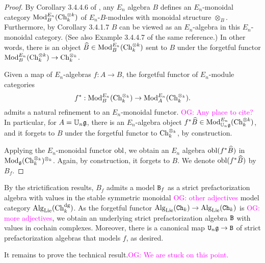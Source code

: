 \documentclass[11pt]{amsart}
\numberwithin{equation}{section}
\def\owen{\textcolor{magenta}{OG: }\textcolor{magenta}}
\begin{document}
\begin{proof}
By Corollary 3.4.4.6 of \cite{LurieHA}, any $E_n$ algebra $B$ defines an $E_n$-monoidal category ${\rm Mod}_B^{E_n} ({\rm Ch}_k^{\otimes k})$ of $E_n$-$B$-modules with monoidal structure $\otimes_B$. 
Furthermore, by Corollary 3.4.1.7 \cite{LurieHA} $B$ can be viewed as an $E_n$-algebra in this $E_n$-monoidal category. 
(See also Example 3.4.4.7 of the same reference.)
In other words, there is an object $\widehat{B} \in  {\rm Mod}_B^{E_n} ({\rm Ch}_k^{\otimes k})$ sent to $B$ under the forgetful functor ${\rm Mod}_B^{E_n} ({\rm Ch}_k^{\otimes k}) \to {\rm Ch}_k^{\otimes_k}$. 

Given a map of $E_n$-algebras $f : A \to B$, 
the forgetful functor of $E_n$-module categories 
\[
f^* :  {\rm Mod}_B^{E_n} ({\rm Ch}_k^{\otimes_k}) \to  {\rm Mod}_A^{E_n} ({\rm Ch}_k^{\otimes_k}) .
\]
admits a natural refinement to an $E_n$-monoidal functor.
\owen{Any place to cite?}
In particular, for $A = \mathbb U_n \mathfrak g$, there is an $E_n$-algebra object $f^*\widehat{B} \in {\rm Mod}_{\mathbb U_n \mathfrak g}^{E_n} ({\rm Ch}_k^{\otimes k})$, and it forgets to $B$ under the forgetful functor to ${\rm Ch}_k^{\otimes_k}$, by construction. 

Applying the $E_n$-monoidal functor ${\rm obl}$, we obtain an $E_n$ algebra ${\rm obl}(f^*\widehat{B})$ in ${\rm Mod}_\mathfrak g({\rm Ch}_k^{\otimes_k})^{\otimes_k}$.
Again, by construction, it forgets to $B$.
We denote ${\rm obl}(f^*\widehat{B})$ by~$B_f$.
\end{proof}

\begin{rmk}
By the strictification results, $B_f$ admits a model ${\tt B}_f$ as a strict prefactorization algebra with values in the stable symmetric monoidal \owen{other adjectives} model category ${\rm Alg}_{\rm Lie}({\rm Ch}_k^{\rm dg})$.
As the forgetful functor ${\rm Alg}_{\rm Lie}({\tt Ch}_k) \to {\rm Alg}_{\rm Lie}({\tt Ch}_k)$ is \owen{more adjectives},
we obtain an underlying strict prefactorization algebra ${\tt B}$ with values in cochain complexes.
Moreover, there is a canonical map ${\tt U}_n \mathfrak g \to {\tt B}$ of strict prefactorization algebras that models $f$, as desired.
\end{rmk}

It remains to prove the technical result.\owen{We are stuck on this point.}
\end{document}
